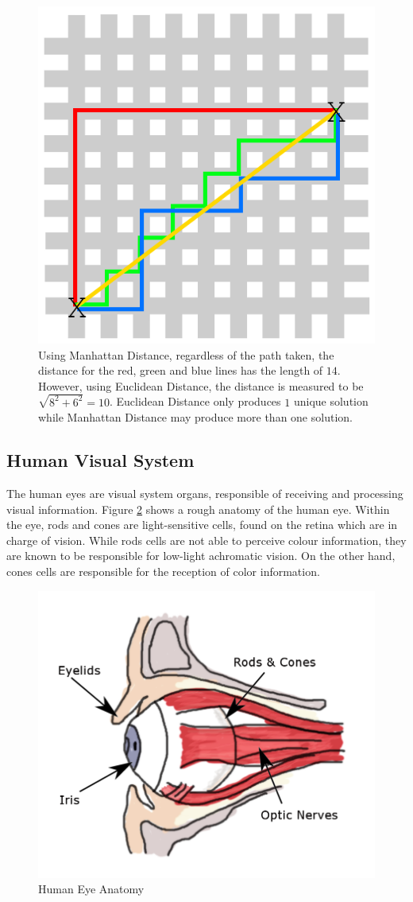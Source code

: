 \begin{figure}[hbt!]\centering
\includegraphics[width=.5\textwidth]{image/lit/manhattan.png}
\caption{Using Manhattan Distance, regardless of the path taken, the distance for the red, green and blue lines has the length of $14$. However, using Euclidean Distance, the distance is measured to be $\sqrt{8^2+6^2} = 10$. Euclidean Distance only produces $1$ unique solution while Manhattan Distance may produce more than one solution.}
\label{fig:manhattan}
\end{figure}


\subsection{Human Visual System}
\label{section:eyes}
The human eyes are visual system organs, responsible of receiving and processing visual information. Figure \ref{fig:eyes} shows a rough anatomy of the human eye. Within the eye, rods and cones are light-sensitive cells, found on the retina which are in charge of vision. While rods cells are not able to perceive colour information, they are known to be responsible for low-light achromatic vision. On the other hand, cones cells are responsible for the reception of color information.   


\begin{figure}[hbt!]\centering
\includegraphics[width=.5\textwidth]{image/lit/rodsandconscolored.png}
\caption{Human Eye Anatomy}
\label{fig:eyes}
\end{figure}

